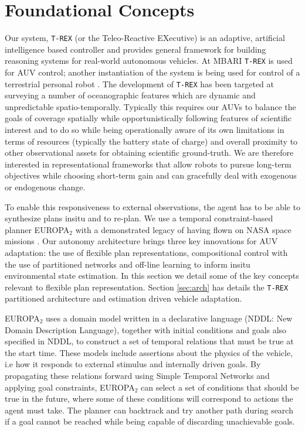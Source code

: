 \section{Foundational Concepts}
\label{sec:concepts}

Our system, \texttt{T-REX} (or the Teleo-Reactive EXecutive) is an
adaptive, artificial intelligence based controller and provides
general framework for building reasoning systems for real-world
autonomous vehicles. At MBARI \texttt{T-REX} is used for AUV control;
another instantiation of the system is being used for control of a
terrestrial personal robot \cite{pr2, Meeussen:2010dn}. The development of
\texttt{T-REX} has been targeted at surveying a number of
oceanographic features which are dynamic and unpredictable
spatio-temporally. Typically this requires our AUVs to balance the
goals of coverage spatially while opportunistically following features
of scientific interest and to do so while being operationally aware of
its own limitations in terms of resources (typically the battery state
of charge) and overall proximity to other observational assets for
obtaining scientific ground-truth. We are therefore interested in
representational frameworks that allow robots to pursue long-term
objectives while choosing short-term gain and can gracefully deal with
exogenous or endogenous change.

To enable this responsiveness to external observations, the agent has
to be able to synthesize plans insitu and to re-plan. We use a
temporal constraint-based planner EUROPA$_2$ with a demonstrated
legacy of having flown on NASA space missions
\cite{Jonsson00,bresina05}. Our autonomy architecture brings three key
innovations for AUV adaptation: the use of flexible plan
representations, compositional control with the use of partitioned
networks and off-line learning to inform insitu environmental state
estimation. In this section we detail some of the key concepts
relevant to flexible plan representation. Section \ref{sec:arch} has
details the \texttt{T-REX} partitioned architecture and estimation
driven vehicle adaptation.


EUROPA$_2$ uses a domain model written in a declarative language
(NDDL: New Domain Description Language), together with initial
conditions and goals also specified in NDDL, to construct a set of
temporal relations that must be true at the start time. These models
include assertions about the physics of the vehicle, i.e how it
responds to external stimulus and internally driven goals. By
propagating these relations forward using Simple Temporal Networks
\cite{dechter91} and applying goal constraints, EUROPA$_2$ can select
a set of conditions that should be true in the future, where some of
these conditions will correspond to actions the agent must take. The
planner can backtrack and try another path during search if a goal
cannot be reached while being capable of discarding unachievable
goals.

